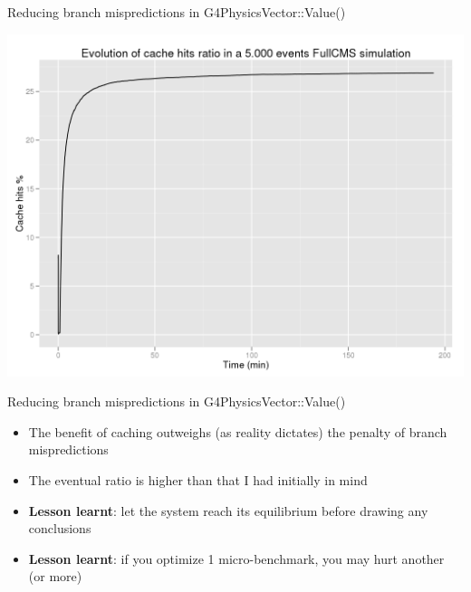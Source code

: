 \documentclass{beamer}
\begin{document}
\begin{frame}{Reducing branch mispredictions in G4PhysicsVector::Value()}
\begin{center}
  \includegraphics[width=1.0\textwidth]{G4PhysicsVector-Value.png}
\end{center}
\end{frame}

\begin{frame}{Reducing branch mispredictions in G4PhysicsVector::Value()}
\begin{itemize}
\item The benefit of caching outweighs (as reality dictates) the penalty of
branch mispredictions
\item The eventual ratio is higher than that I had initially in mind
\vspace{5mm}
\item {\bf Lesson learnt}: let the system reach its equilibrium before drawing any conclusions
\item {\bf Lesson learnt}: if you optimize 1 micro-benchmark, you may hurt another (or more)
\end{itemize}
\end{frame}
\end{document}
